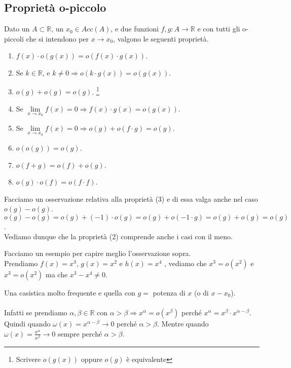 \subsection{Proprietà o-piccolo}
Dato un $A \subset \mathbb{R}$, un $x_0 \in Acc(A)$, e due funzioni $f,g: A \to \mathbb{R}$ e con tutti gli o-piccoli che si intendono per $x\to x_0$, valgono le seguenti proprietà.
\begin{enumerate}
    \item $f(x) \cdot o(g(x)) = o(f(x) \cdot g(x))$.
    \item Se $k \in \mathbb{R}$, e $k \neq 0 \Longrightarrow o(k \cdot g(x)) = o(g(x))$.
    \item $o(g) + o(g) = o(g)$. \footnote{Scrivere $o(g(x))$ oppure $o(g)$ è equivalente}
    \item Se $\lim\limits_{x\to x_0}f(x) = 0 \Longrightarrow f(x) \cdot g(x) = o(g(x))$.
    \item Se $\lim\limits_{x\to x_0}f(x) = 0 \Longrightarrow o(g) + o(f \cdot g) = o(g)$.
    \item $o(o(g)) = o(g)$.
    \item $o(f + g) = o(f) + o(g)$.
    \item $o(g) \cdot o(f) = o(f \cdot f)$.
\end{enumerate}

\begin{observation}
Facciamo un osservazione relativa alla proprietà (3) e di essa valga anche nel caso $o(g) - o(g)$.\\
$o(g) - o(g) = o(g) + (-1)\cdot o(g) = o(g) + o(-1 \cdot g) = o(g) + o(g) = o(g)$. \\
Vediamo dunque che la proprietà (2) comprende anche i casi con il meno.
\end{observation}

\begin{example}
Facciamo un esempio per capire meglio l'osservazione sopra. \\
Prendiamo $f(x) = x^3$, $g(x) = x^2$ e $h(x) = x^4$ , vediamo che $x^3 = o(x^2)$ e $x^3 = o(x^2)$ ma che $x^3 - x^4 \neq 0$.
\end{example}

\begin{observation}
Una casistica molto frequente e quella con $g = $ potenza di $x$ (o di $x - x_0$).\\\\
Infatti se prendiamo $\alpha, \beta \in \mathbb{R}$ con $\alpha > \beta \Longrightarrow x^\alpha = o(x^\beta)$ perché $x^\alpha = x^\beta \cdot x^{\alpha - \beta}$.\\
Quindi quando $\omega(x) = x^{\alpha-\beta} \to 0$ perché $\alpha > \beta$.
Mentre quando $\omega(x) = \frac{x^\alpha}{x^\beta} \to 0$ sempre perché $\alpha > \beta$.
\end{observation}

